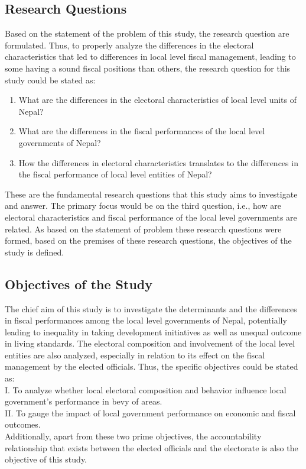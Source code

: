 \subsection{Research Questions}
Based on the statement of the problem of this study, the research question are formulated. Thus, to properly analyze the differences in the electoral characteristics that led to differences in local level fiscal management, leading to some having a sound fiscal positions than others, the research question for this study could be stated as:
\begin{enumerate}[label=\roman*.]
    \item What are the differences in the electoral characteristics of  local level units of Nepal? 
    \item What are the differences in the fiscal performances of the local level governments of Nepal?
    \item How the differences in electoral characteristics translates to the differences in the fiscal performance of local level entities of Nepal?
 \end{enumerate}
      These are the fundamental research questions that this study aims to investigate and answer. The primary focus would be on the third question, i.e., how are electoral characteristics and fiscal performance of the local level governments are related. As based on the statement of problem these research questions were formed, based on the premises of these research questions, the objectives of the study is defined. \vspace{-4mm}
\subsection{Objectives of the Study}
The chief aim of this study is to investigate the determinants and the differences in fiscal performances among the local level governments of Nepal, potentially leading to inequality in taking development initiatives as well as unequal outcome in living standards. The electoral composition and involvement of the local level entities are also analyzed, especially in relation to its effect on the fiscal management by the elected officials. Thus, the specific objectives could be stated as:\\
I.\hspace{3mm} To analyze whether local electoral composition and behavior influence local government's performance in bevy of areas.  \\
II.\hspace{3mm} To gauge the impact of local government performance on economic and fiscal outcomes.\\
Additionally, apart from these two prime objectives, the accountability relationship that exists between the elected officials and  the electorate is also the objective of this study. \vspace{-3mm}
